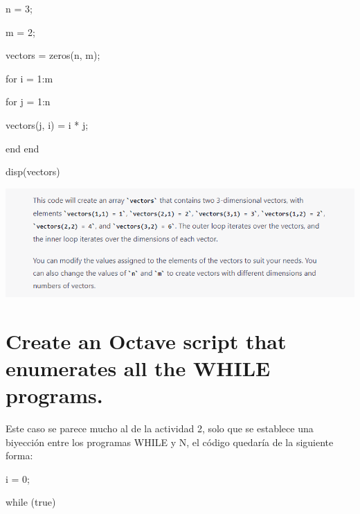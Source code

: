 \documentclass{article}
\begin{document}
\vspace{5mm}


n = 3; %

m = 2; %


vectors = zeros(n, m);


for i = 1:m

  for j = 1:n
  
    vectors(j, i) = i * j; %
    
    
  end
end



disp(vectors)

\vspace{5mm}

\includegraphics[scale=0.75]{4.2 TALF.png}

\newpage

\section{\large{Create an Octave script that enumerates all the WHILE programs.}}

\vspace{3mm}

Este caso se parece mucho al de la actividad 2, solo que se establece una biyección entre los programas WHILE y N, el código quedaría de la siguiente forma:

\vspace{4mm}


i = 0;


while (true)
  
\end{document}
